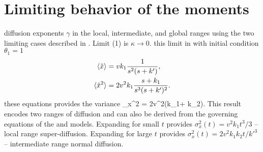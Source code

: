 \section{Limiting behavior of the moments}
\label{sec:appendixC}

\DIFdelbegin {}\DIFdelend \DIFaddbegin {}\DIFaddend diffusion exponents $\gamma$ in the local, intermediate, and global ranges using the two limiting cases described in \DIFdelbegin {}\DIFdelend \DIFaddbegin {}\DIFaddend .
Limit (1) is $\kappa \rightarrow 0$. \DIFdelbegin {}\DIFdelend \DIFaddbegin {}\DIFaddend this limit in \DIFdelbegin {}\DIFdelend \DIFaddbegin {}\DIFaddend with initial condition $\theta_1=1$ \DIFdelbegin {}\DIFdelend \DIFaddbegin {}\DIFaddend \begin{align}
	\langle \tilde{x} \rangle &= vk_1 \frac{1 }{s^2(s+k')}, \label{eq:li1}\\
	\langle \tilde{x}^2 \rangle &= 2v^2k_1 \frac{s+k_1}{s^3(s+k')^2}. \label{eq:li2}
\end{align}
\DIFdelbegin {}\DIFdelend \DIFaddbegin {}\DIFaddend these equations provides the variance
\be \sigma_x^2 = 2v^2\Big(k_1 + k_2\big[-2+k't + (2+k't)e^{-k't}\big]\Big).\label{eq:li}\ee
This result encodes two ranges of diffusion and can also be derived from the governing equations of the \citet{Lisle1998} and \citet{Lajeunesse2017} models.
Expanding for small $t$ provides $\sigma_x^2(t) = v^2k_1t^3/3$ -- local range super-diffusion.
Expanding for large $t$ provides $\sigma_x^2(t) = 2v^2k_1k_2t/k'^3$ -- intermediate range normal diffusion.

